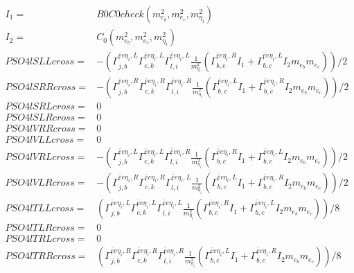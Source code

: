 \documentclass[A4,landscape]{article}
\begin{document}
\begin{align} 
I_1= & B0C0check(m^2_{e_{{b}}}, m^2_{e_{{c}}}, m^2_{\eta_i}) \\ 
I_2= & C_0(m^2_{e_{{b}}}, m^2_{e_{{c}}}, m^2_{\eta_i}) \\ 
  PSO4lSLLcross= & -( \Gamma^{\bar{e}e \eta_i ,L}_{j, b} \Gamma^{\bar{e}e \eta_i ,L}_{c, k} \Gamma^{\bar{e}e \eta_i ,L}_{l, i} \frac{1}{m^2_{\eta_i}} (\Gamma^{\bar{e}e \eta_i ,R}_{b, c} I_1 + \Gamma^{\bar{e}e \eta_i ,L}_{b, c} I_2 m_{e_{{b}}} m_{e_{{c}}}))/2 \\ 
  PSO4lSRRcross= & -( \Gamma^{\bar{e}e \eta_i ,R}_{j, b} \Gamma^{\bar{e}e \eta_i ,R}_{c, k} \Gamma^{\bar{e}e \eta_i ,R}_{l, i} \frac{1}{m^2_{\eta_i}} (\Gamma^{\bar{e}e \eta_i ,L}_{b, c} I_1 + \Gamma^{\bar{e}e \eta_i ,R}_{b, c} I_2 m_{e_{{b}}} m_{e_{{c}}}))/2 \\ 
  PSO4lSRLcross= & 0 \\ 
  PSO4lSLRcross= & 0 \\ 
  PSO4lVRRcross= & 0 \\ 
  PSO4lVLLcross= & 0 \\ 
  PSO4lVRLcross= & -( \Gamma^{\bar{e}e \eta_i ,L}_{j, b} \Gamma^{\bar{e}e \eta_i ,L}_{c, k} \Gamma^{\bar{e}e \eta_i ,R}_{l, i} \frac{1}{m^2_{\eta_i}} (\Gamma^{\bar{e}e \eta_i ,R}_{b, c} I_1 + \Gamma^{\bar{e}e \eta_i ,L}_{b, c} I_2 m_{e_{{b}}} m_{e_{{c}}}))/2 \\ 
  PSO4lVLRcross= & -( \Gamma^{\bar{e}e \eta_i ,R}_{j, b} \Gamma^{\bar{e}e \eta_i ,R}_{c, k} \Gamma^{\bar{e}e \eta_i ,L}_{l, i} \frac{1}{m^2_{\eta_i}} (\Gamma^{\bar{e}e \eta_i ,L}_{b, c} I_1 + \Gamma^{\bar{e}e \eta_i ,R}_{b, c} I_2 m_{e_{{b}}} m_{e_{{c}}}))/2 \\ 
  PSO4lTLLcross= & ( \Gamma^{\bar{e}e \eta_i ,L}_{j, b} \Gamma^{\bar{e}e \eta_i ,L}_{c, k} \Gamma^{\bar{e}e \eta_i ,L}_{l, i} \frac{1}{m^2_{\eta_i}} (\Gamma^{\bar{e}e \eta_i ,R}_{b, c} I_1 + \Gamma^{\bar{e}e \eta_i ,L}_{b, c} I_2 m_{e_{{b}}} m_{e_{{c}}}))/8 \\ 
  PSO4lTLRcross= & 0 \\ 
  PSO4lTRLcross= & 0 \\ 
  PSO4lTRRcross= & ( \Gamma^{\bar{e}e \eta_i ,R}_{j, b} \Gamma^{\bar{e}e \eta_i ,R}_{c, k} \Gamma^{\bar{e}e \eta_i ,R}_{l, i} \frac{1}{m^2_{\eta_i}} (\Gamma^{\bar{e}e \eta_i ,L}_{b, c} I_1 + \Gamma^{\bar{e}e \eta_i ,R}_{b, c} I_2 m_{e_{{b}}} m_{e_{{c}}}))/8 \\ 
\end{align} 
\end{document}
